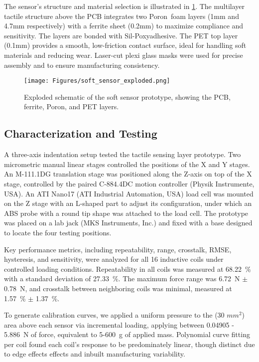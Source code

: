 The sensor's structure and material selection is illustrated in \cref{fig:soft_sensor}.
The multilayer tactile structure above the \ac{PCB} integrates two Poron\textregistered\ foam layers (1mm and 4.7mm respectively) with a ferrite sheet (0.2mm) to maximize compliance and sensitivity. 
The layers are bonded with Sil-Poxy\textregistered adhesive.
The \ac{PET} top layer (0.1mm) provides a smooth, low-friction contact surface, ideal for handling soft materials and reducing wear. Laser-cut plexi glass masks were used for precise assembly and to ensure manufacturing consistency.

\begin{figure}[t]
    \centering
    \texttt{[image: Figures/soft\_sensor\_exploded.png]}
    \caption{Exploded schematic of the soft sensor prototype, showing the PCB, ferrite, Poron\textregistered, and PET layers.}
    \label{fig:soft_sensor}
\end{figure}

\subsection{Characterization and Testing}

A three-axis indentation setup tested the tactile sensing layer prototype. Two micrometric manual linear stages controlled the positions of the X and Y stages. An M-111.1DG translation stage was positioned along the Z-axis on top of the X stage, controlled by the paired C-884.4DC motion controller (Physik Instrumente, USA). An ATI Nano17 (ATI Industrial Automation, USA) load cell was mounted on the Z stage with an L-shaped part to adjust its configuration, under which an ABS probe with a round tip shape was attached to the load cell. The prototype was placed on a lab jack (MKS Instruments, Inc.) and fixed with a base designed to locate the four testing positions. 

Key performance metrics, including repeatability, range, crosstalk, RMSE, hysteresis, and sensitivity, were analyzed for all 16 inductive coils under controlled loading conditions. Repeatability in all coils was measured at 68.22~\% with a standard deviation of 27.33~\%. The maximum force range was 6.72~N $\pm$ 0.78~N, and crosstalk between neighboring coils was minimal, measured at 1.57~\% $\pm$ 1.37~\%.

To generate calibration curves, we applied a uniform pressure to the (30 \(mm^2\)) area above each sensor via incremental loading, applying between 0.04905 - 5.886~N of force, equivalent to 5-600~g of applied mass. 
Polynomial curve fitting per coil found each coil's response to be predominately linear, though distinct due to edge effects effects and inbuilt manufacturing variability.







